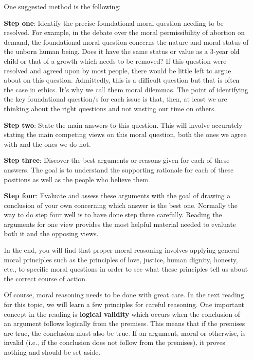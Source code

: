 \documentclass[
]{book}
\begin{document}
One suggested method is the following:

\textbf{Step one}: Identify the precise foundational moral question needing to be resolved. For example, in the debate over the moral permissibility of abortion on demand, the foundational moral question concerns the nature and moral status of the unborn human being. Does it have the same status or value as a 3-year old child or that of a growth which needs to be removed? If this question were resolved and agreed upon by most people, there would be little left to argue about on this question. Admittedly, this is a difficult question but that is often the case in ethics. It's why we call them moral dilemmas. The point of identifying the key foundational question/s for each issue is that, then, at least we are thinking about the right questions and not wasting our time on others.

\textbf{Step two}: State the main answers to this question. This will involve accurately stating the main competing views on this moral question, both the ones we agree with and the ones we do not.

\textbf{Step three}: Discover the best arguments or reasons given for each of these answers. The goal is to understand the supporting rationale for each of these positions as well as the people who believe them.

\textbf{Step four}: Evaluate and assess these arguments with the goal of drawing a conclusion of your own concerning which answer is the best one. Normally the way to do step four well is to have done step three carefully. Reading the arguments for one view provides the most helpful material needed to evaluate both it and the opposing views.

In the end, you will find that proper moral reasoning involves applying general
moral principles such as the principles of love, justice, human dignity,
honesty, etc., to specific moral questions in order to see what these principles
tell us about the correct course of action.

Of course, moral reasoning needs to be done with great care. In the text reading
for this topic, we will learn a few principles for careful reasoning. One
important concept in the reading is \textbf{logical validity} which occurs when the
conclusion of an argument follows logically from the premises. This means that
if the premises are true, the conclusion must also be true. If an argument,
moral or otherwise, is invalid (i.e., if the conclusion does not follow from the
premises), it proves nothing and should be set aside.
\end{document}
